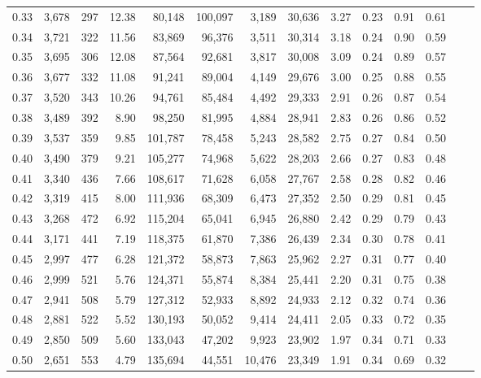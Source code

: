 \begin{tabular}{rrrrrrrrrrrrrr}
0.33 &  3,678 &  297 &   12.38 &   80,148 &  100,097 &   3,189 &  30,636 &  3.27 &  0.23 &  0.91 &      0.61 \\
0.34 &  3,721 &  322 &   11.56 &   83,869 &   96,376 &   3,511 &  30,314 &  3.18 &  0.24 &  0.90 &      0.59 \\
0.35 &  3,695 &  306 &   12.08 &   87,564 &   92,681 &   3,817 &  30,008 &  3.09 &  0.24 &  0.89 &      0.57 \\
0.36 &  3,677 &  332 &   11.08 &   91,241 &   89,004 &   4,149 &  29,676 &  3.00 &  0.25 &  0.88 &      0.55 \\
0.37 &  3,520 &  343 &   10.26 &   94,761 &   85,484 &   4,492 &  29,333 &  2.91 &  0.26 &  0.87 &      0.54 \\
0.38 &  3,489 &  392 &    8.90 &   98,250 &   81,995 &   4,884 &  28,941 &  2.83 &  0.26 &  0.86 &      0.52 \\
0.39 &  3,537 &  359 &    9.85 &  101,787 &   78,458 &   5,243 &  28,582 &  2.75 &  0.27 &  0.84 &      0.50 \\
0.40 &  3,490 &  379 &    9.21 &  105,277 &   74,968 &   5,622 &  28,203 &  2.66 &  0.27 &  0.83 &      0.48 \\
0.41 &  3,340 &  436 &    7.66 &  108,617 &   71,628 &   6,058 &  27,767 &  2.58 &  0.28 &  0.82 &      0.46 \\
0.42 &  3,319 &  415 &    8.00 &  111,936 &   68,309 &   6,473 &  27,352 &  2.50 &  0.29 &  0.81 &      0.45 \\
0.43 &  3,268 &  472 &    6.92 &  115,204 &   65,041 &   6,945 &  26,880 &  2.42 &  0.29 &  0.79 &      0.43 \\
0.44 &  3,171 &  441 &    7.19 &  118,375 &   61,870 &   7,386 &  26,439 &  2.34 &  0.30 &  0.78 &      0.41 \\
0.45 &  2,997 &  477 &    6.28 &  121,372 &   58,873 &   7,863 &  25,962 &  2.27 &  0.31 &  0.77 &      0.40 \\
0.46 &  2,999 &  521 &    5.76 &  124,371 &   55,874 &   8,384 &  25,441 &  2.20 &  0.31 &  0.75 &      0.38 \\
0.47 &  2,941 &  508 &    5.79 &  127,312 &   52,933 &   8,892 &  24,933 &  2.12 &  0.32 &  0.74 &      0.36 \\
0.48 &  2,881 &  522 &    5.52 &  130,193 &   50,052 &   9,414 &  24,411 &  2.05 &  0.33 &  0.72 &      0.35 \\
0.49 &  2,850 &  509 &    5.60 &  133,043 &   47,202 &   9,923 &  23,902 &  1.97 &  0.34 &  0.71 &      0.33 \\
0.50 &  2,651 &  553 &    4.79 &  135,694 &   44,551 &  10,476 &  23,349 &  1.91 &  0.34 &  0.69 &      0.32 \\

\end{tabular}

